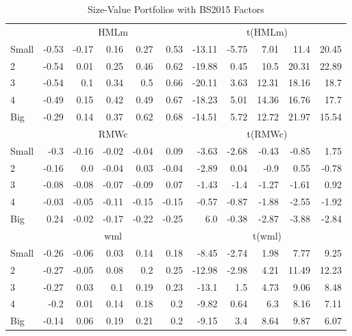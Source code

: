 \begin{table}[!ht]
\begin{tabular}{lrrrrrrrrrr}
  

      & \multicolumn{5}{c}{HMLm} & \multicolumn{5}{c}{t(HMLm)} \\
    \cmidrule(r){2-6} \cmidrule(r){7-11}
      Small  & -0.53  & -0.17  & 0.16  & 0.27  & 0.53   & -13.11  & -5.75  & 7.01  & 11.4  & 20.45  \\
          2  & -0.54  & 0.01  & 0.25  & 0.46  & 0.62   & -19.88  & 0.45  & 10.5  & 20.31  & 22.89  \\
          3  & -0.54  & 0.1  & 0.34  & 0.5  & 0.66   & -20.11  & 3.63  & 12.31  & 18.16  & 18.7  \\
          4  & -0.49  & 0.15  & 0.42  & 0.49  & 0.67   & -18.23  & 5.01  & 14.36  & 16.76  & 17.7  \\
      Big    & -0.29  & 0.14  & 0.37  & 0.62  & 0.68   & -14.51  & 5.72  & 12.72  & 21.97  & 15.54  \\

  

      & \multicolumn{5}{c}{RMWc} & \multicolumn{5}{c}{t(RMWc)} \\
    \cmidrule(r){2-6} \cmidrule(r){7-11}
      Small  & -0.3  & -0.16  & -0.02  & -0.04  & 0.09   & -3.63  & -2.68  & -0.43  & -0.85  & 1.75  \\
          2  & -0.16  & 0.0  & -0.04  & 0.03  & -0.04   & -2.89  & 0.04  & -0.9  & 0.55  & -0.78  \\
          3  & -0.08  & -0.08  & -0.07  & -0.09  & 0.07   & -1.43  & -1.4  & -1.27  & -1.61  & 0.92  \\
          4  & -0.03  & -0.05  & -0.11  & -0.15  & -0.15   & -0.57  & -0.87  & -1.88  & -2.55  & -1.92  \\
      Big    & 0.24  & -0.02  & -0.17  & -0.22  & -0.25   & 6.0  & -0.38  & -2.87  & -3.88  & -2.84  \\

  

      & \multicolumn{5}{c}{wml} & \multicolumn{5}{c}{t(wml)} \\
    \cmidrule(r){2-6} \cmidrule(r){7-11}
      Small  & -0.26  & -0.06  & 0.03  & 0.14  & 0.18   & -8.45  & -2.74  & 1.98  & 7.77  & 9.25  \\
          2  & -0.27  & -0.05  & 0.08  & 0.2  & 0.25   & -12.98  & -2.98  & 4.21  & 11.49  & 12.23  \\
          3  & -0.27  & 0.03  & 0.1  & 0.19  & 0.23   & -13.1  & 1.5  & 4.73  & 9.06  & 8.48  \\
          4  & -0.2  & 0.01  & 0.14  & 0.18  & 0.2   & -9.82  & 0.64  & 6.3  & 8.16  & 7.11  \\
      Big    & -0.14  & 0.06  & 0.19  & 0.21  & 0.2   & -9.15  & 3.4  & 8.64  & 9.87  & 6.07  \\

  

  \bottomrule
\end{tabular}
\caption{Size-Value Portfolios with BS2015 Factors} 
\label{25_Size_Value_BS2015}
\end{table}